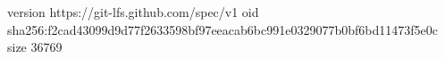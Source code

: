 version https://git-lfs.github.com/spec/v1
oid sha256:f2cad43099d9d77f2633598bf97eeacab6bc991e0329077b0bf6bd11473f5e0c
size 36769
